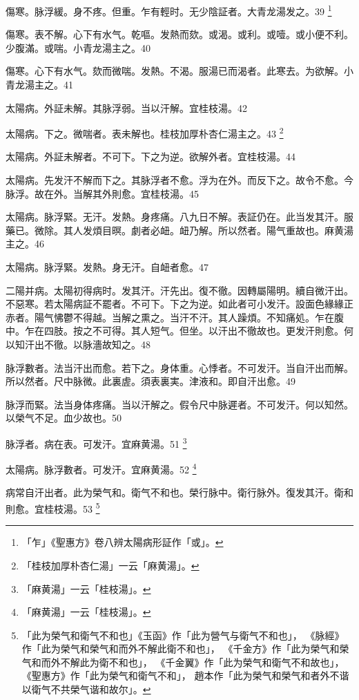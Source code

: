 傷寒。脉浮緩。身不疼。但重。乍有輕时。无少陰証者。大青龙湯发之。39
	\footnote{
		「乍」《聖惠方》卷八辨太陽病形証作「或」。
	}

傷寒。表不解。心下有水气。乾嘔。发熱而欬。或渴。或利。或噎。或小便不利。少腹滿。或喘。小青龙湯主之。40

傷寒。心下有水气。欬而微喘。发熱。不渴。服湯已而渴者。此寒去。为欲解。小青龙湯主之。41

太陽病。外証未解。其脉浮弱。当以汗解。宜桂枝湯。42

太陽病。下之。微喘者。表未解也。桂枝{\khaai 加厚朴杏仁}湯主之。43
	\footnote{
		「桂枝加厚朴杏仁湯」一云「麻黄湯」。
	}

太陽病。外証未解者。不可下。下之为逆。欲解外者。宜桂枝湯。44

太陽病。先发汗不解而下之。其脉浮者不愈。浮为在外。而反下之。故令不愈。今脉浮。故在外。当解其外則愈。宜桂枝湯。45

太陽病。脉浮緊。无汗。发熱。身疼痛。八九日不解。表証仍在。此当发其汗。服藥已。微除。其人发煩目暝。劇者必衄。衄乃解。所以然者。陽气重故也。麻黄湯主之。46

太陽病。脉浮緊。发熱。身无汗。自衄者愈。47

二陽并病。太陽初得病时。发其汗。汗先出{\khaai 。復}不徹。因轉屬陽明。續自微汗出。不惡寒。若太陽病証不罷者。不可下。下之为逆。如此者可小发汗。設面色緣緣正赤者。陽气怫鬱不得越。当解之熏之。当汗不汗。其人躁煩。不知痛処。乍在腹中。乍在四肢。按之不可得。其人短气。但坐。以汗出不徹故也。更发汗則愈。何以知汗出不徹。以脉濇故知之。48

脉浮數者。法当汗出而愈。若下之。身体重。心悸者。不可发汗。当自汗出而解。所以然者。尺中脉微。此裏虗。須表裏実。津液和。即自汗出愈。49

脉浮而緊。法当身体疼痛。当以汗解之。假令尺中脉遲者。不可发汗。何以知然。以榮气不足。血少故也。50

脉浮者。病在表。可发汗。宜麻黄湯。51
	\footnote{
		「麻黄湯」一云「桂枝湯」。
	}

{\khaai 太陽病。}脉浮數者。可发汗。宜麻黄湯。52
	\footnote{
		「麻黄湯」一云「桂枝湯」。
	}

病常自汗出者。此为榮气和。衛气不和也。榮行脉中。衛行脉外。復发其汗。衛和則愈。宜桂枝湯。53
	\footnote{
		「此为榮气和衛气不和也」《玉函》作「此为營气与衛气不和也」，
		《脉經》作「此为榮气和榮气和而外不解此衛不和也」，
		《千金方》作「此为榮气和榮气和而外不解此为衛不和也」，
		《千金翼》作「此为榮气和衛气不和故也」，
		《聖惠方》作「此为榮气和衛气不和」，
		趙本作「此为榮气和榮气和者外不谐以衛气不共榮气谐和故尔」。
	}

